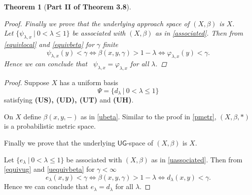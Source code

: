 \documentclass[10pt,a4paper]{amsart}
\newtheorem{theorem}{Theorem}
\renewcommand{\b}{\ensuremath{\beta}}
\renewcommand{\l}{\ensuremath{\lambda}}
\newcommand{\ug}{\ensuremath{\mathsf{UG}}}
\begin{document}
\begin{theorem} [\bf Part II of Theorem 3.8]
\begin{proof}
Finally we prove that the underlying approach space of $(X,\b)$ is $X$.\\
Let $\{\psi_{\l,x} \ | \ 0 < \l \leq 1 \}$ be associated with $(X,\b)$ as in \eqref{associated}. Then from \eqref{equivlocal}  and \ref{equivbeta} for $\gamma$ finite
$$
\psi_{\l,x}(y) < \gamma \Leftrightarrow \b(x,y, \gamma) > 1 - \l \Leftrightarrow \varphi_{\l,x}(y) < \gamma.
$$
Hence we can conclude that \ $\psi_{\l,x} = \varphi_{\l,x}$ for all $\l$. 
\end{proof}
\end{theorem}

\begin{proof}
Suppose
$X$ has a uniform basis 
$$
\Psi = \{ d_\l  \ | \ 0  < \l \leq 1 \}
$$
satisfying {\bf(US), (UD), (UT)} and {\bf(UH)}.

On $X$ define $\b(x,y, -)$ as in \eqref{ubeta}.
Similar to the proof in \ref{pmetr},
$(X, \b, *) $ is a probabilistic metric space.



Finally we prove that the underlying $\ug$-space of $(X,\b)$ is $X$.

Let $\{ e_\l \ | \ 0 < \l \leq 1 \}$ be associated with $(X,\b)$ as in \eqref{uassociated}. Then from \eqref{equivug}  and \ref{uequivbeta} for $\gamma<\infty$ 
$$
e_\l(x, y) < \gamma \Leftrightarrow \b(x,y, \gamma) > 1 - \l \Leftrightarrow d_\l(x, y) < \gamma.
$$
Hence we can conclude that $e_\l = d_{\l}$ for all $\l$.
\end{proof}
\end{document}
